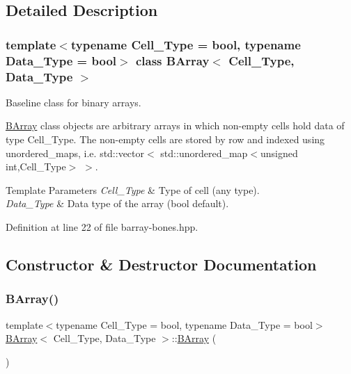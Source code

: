 \subsection{Detailed Description}
\subsubsection*{template$<$typename Cell\+\_\+\+Type = bool, typename Data\+\_\+\+Type = bool$>$\newline
class B\+Array$<$ Cell\+\_\+\+Type, Data\+\_\+\+Type $>$}

Baseline class for binary arrays. 

{\ttfamily \hyperlink{class_b_array}{B\+Array}} class objects are arbitrary arrays in which non-\/empty cells hold data of type {\ttfamily Cell\+\_\+\+Type}. The non-\/empty cells are stored by row and indexed using {\ttfamily unordered\+\_\+map}s, i.\+e. {\ttfamily std\+::vector$<$ std\+::unordered\+\_\+map$<$unsigned int,Cell\+\_\+\+Type$>$ $>$}.


\begin{DoxyTemplParams}{Template Parameters}
{\em Cell\+\_\+\+Type} & Type of cell (any type). \\
\hline
{\em Data\+\_\+\+Type} & Data type of the array (bool default). \\
\hline
\end{DoxyTemplParams}


Definition at line 22 of file barray-\/bones.\+hpp.



\subsection{Constructor \& Destructor Documentation}
\mbox{\label{class_b_array_a1bbfcc43ad43f30fd448b63e9ab5861f}} 
\subsubsection{\texorpdfstring{B\+Array()}{BArray()}\hspace{0.1cm}{\footnotesize\ttfamily [1/5]}}
{\footnotesize\ttfamily template$<$typename Cell\+\_\+\+Type = bool, typename Data\+\_\+\+Type = bool$>$ \\
\hyperlink{class_b_array}{B\+Array}$<$ Cell\+\_\+\+Type, Data\+\_\+\+Type $>$\+::\hyperlink{class_b_array}{B\+Array} (\begin{DoxyParamCaption}{ }\end{DoxyParamCaption})\hspace{0.3cm}{\ttfamily [inline]}}



